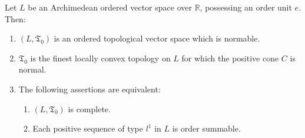 Let $L$ be an Archimedean ordered vector space over $\mathbb{R}$, possessing an order unit $e$. Then:
\begin{enumerate}
\item $(L, \mathfrak{T}_0)$ is an ordered topological vector space which is normable.
\item $\mathfrak{T}_0$ is the finest locally convex topology on $L$ for which the positive cone $C$ is normal.
\item The following assertions are equivalent:
  \begin{enumerate}
  \item[(a)] $(L, \mathfrak{T}_0)$ is complete.
  \item[(b)] Each positive sequence of type $l^1$ in $L$ is order summable.
  \end{enumerate}
\end{enumerate}
